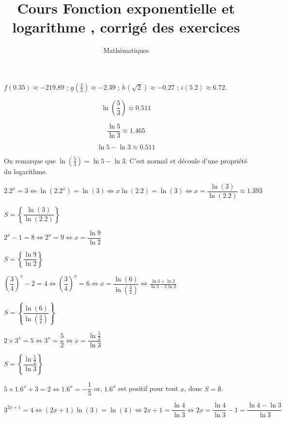 \documentclass[a4paper,12pt]{scrartcl}
\date{}
\title{Cours \og Fonction exponentielle et logarithme \fg{}, corrigé des exercices}
\author{Mathématiques}
\begin{document}
\maketitle


\exo{}

$f\left(0.35 \right) \approx -219.89$ ;
$g\left( \frac{2}{3} \right) \approx -2.39$ ; 
$h\left(\sqrt{2} \right) \approx -0.27$ ;
$i\left(5.2 \right) \approx 6.72$.


$$\ln \left( \frac{5}{3} \right) \approx 0.511$$

$$\frac{\ln 5}{\ln 3} \approx 1.465$$

$$\ln 5 - \ln 3 \approx 0.511$$

On remarque que $\ln \left( \frac{5}{3} \right) = \ln 5 - \ln 3$. C'est normal et découle d'une propriété du logarithme. 


\question{}
$2.2^x = 3 \Leftrightarrow \ln(2.2^x) = \ln(3) \Leftrightarrow x \ln(2.2) = \ln(3) \Leftrightarrow x = \dfrac{\ln(3)}{\ln(2.2)} \approx 1.393$

$S = \left\lbrace \dfrac{\ln(3)}{\ln(2.2)} \right\rbrace$

\question{}
$2^x - 1 = 8 \Leftrightarrow 2^x = 9 \Leftrightarrow x = \dfrac{\ln 9}{\ln 2}$

$S = \left\lbrace \dfrac{\ln 9}{\ln 2} \right\rbrace$

\question{}
$\left( \dfrac{3}{4} \right)^x - 2 = 4 \Leftrightarrow \left( \dfrac{3}{4} \right)^x = 6 \Leftrightarrow x = \dfrac{\ln\left( 6 \right)}{\ln(\frac{3}{4})} \Leftrightarrow \frac{\ln 3 + \ln 2}{\ln 3 - 2\ln 2}$

$S = \left\lbrace \dfrac{\ln\left( 6 \right)}{\ln(\frac{3}{4})} \right\rbrace$

\question{}
$2 \times 3^x = 5 \Leftrightarrow 3^x = \dfrac{5}{2} \Leftrightarrow x = \dfrac{ \ln \frac{5}{2} }{\ln 3}$

$S = \left\lbrace \dfrac{ \ln \frac{5}{2} }{\ln 3} \right\rbrace$

\question{}
$5 \times 1.6^x + 3 = 2 \Leftrightarrow 1.6^x = - \dfrac{1}{5}$ or, $1.6^x$ est positif pour tout $x$, donc $S = \emptyset$.

\question{}
$3^{2x+1} = 4 \Leftrightarrow (2x+1) \ln(3) = \ln(4) \Leftrightarrow 2x+1 = \dfrac{\ln 4}{\ln 3} \Leftrightarrow 2x = \dfrac{\ln 4}{\ln 3} - 1 = \dfrac{\ln 4 - \ln 3}{\ln 3}$
\end{document}
